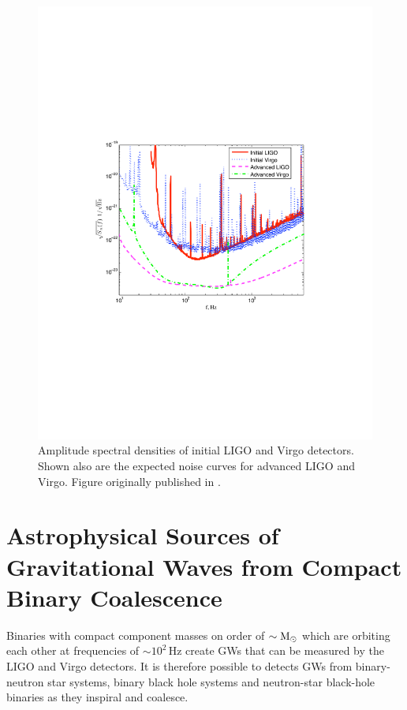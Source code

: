 \begin{figure}[p]
\center
\includegraphics[width=6in]{figures/NoiseCurvesInitAdv.pdf}
\caption{Amplitude spectral densities of initial LIGO and Virgo detectors. Shown also are the expected noise curves for advanced LIGO and Virgo. Figure originally published in \cite{ratesdoc}.}
\label{fig:init_AdvASD}
\end{figure}

\section{Astrophysical Sources of Gravitational Waves from Compact Binary Coalescence}
\label{sec:astrophysics}

Binaries with compact component masses on order of $\sim \mathrm{M_\odot}$ which are orbiting each other at frequencies of $\sim 10^2\,$Hz create \acp{GW} that can be measured by the \ac{LIGO} and Virgo detectors. It is therefore possible to detects \acp{GW} from binary-neutron star systems, binary black hole systems and neutron-star black-hole binaries as they inspiral and coalesce.

